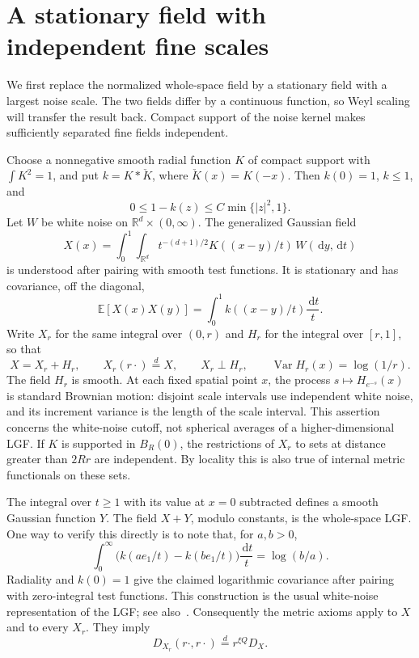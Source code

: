 \documentclass[11pt,letterpaper]{article}
\newcommand{\R}{\mathbb R}
\newcommand{\E}{\mathbb E}
\newcommand{\dd}{\,\mathrm d}
\DeclareMathOperator{\Var}{Var}
\theoremstyle{definition}
\theoremstyle{remark}
\numberwithin{equation}{section}
\begin{document}
\section{A stationary field with independent fine scales}\label{sec:field}

We first replace the normalized whole-space field by a stationary field with a largest noise scale. The two fields differ by a continuous function, so Weyl scaling will transfer the result back. Compact support of the noise kernel makes sufficiently separated fine fields independent.

Choose a nonnegative smooth radial function $K$ of compact support with $\int K^2=1$, and put $k=K*\check K$, where $\check K(x)=K(-x)$. Then $k(0)=1$, $k\le1$, and
\begin{equation}\label{eq:k-bound}
 0\le1-k(z)\le C\min\{|z|^2,1\}.
\end{equation}
Let $W$ be white noise on $\R^d\times(0,\infty)$. The generalized Gaussian field
\begin{equation}\label{eq:cutoff-field}
 X(x)=\int_0^1\int_{\R^d}
       t^{-(d+1)/2}K((x-y)/t)\,W(\dd y,\dd t)
\end{equation}
is understood after pairing with smooth test functions. It is stationary and has covariance, off the diagonal,
\begin{equation*}
 \E[X(x)X(y)]=\int_0^1 k((x-y)/t)\frac{\dd t}{t}.
\end{equation*}
Write $X_r$ for the same integral over $(0,r)$ and $H_r$ for the integral over $[r,1]$, so that
\begin{equation}\label{eq:scale-split}
 X=X_r+H_r,\qquad X_r(r\cdot)\stackrel d=X,\qquad
 X_r\perp H_r,\qquad \Var H_r(x)=\log(1/r).
\end{equation}
The field $H_r$ is smooth. At each fixed spatial point $x$, the process $s\mapsto H_{e^{-s}}(x)$ is standard Brownian motion: disjoint scale intervals use independent white noise, and its increment variance is the length of the scale interval. This assertion concerns the white-noise cutoff, not spherical averages of a higher-dimensional LGF. If $K$ is supported in $B_R(0)$, the restrictions of $X_r$ to sets at distance greater than $2Rr$ are independent. By locality this is also true of internal metric functionals on these sets.

The integral over $t\ge1$ with its value at $x=0$ subtracted defines a smooth Gaussian function $Y$. The field $X+Y$, modulo constants, is the whole-space LGF. One way to verify this directly is to note that, for $a,b>0$,
\begin{equation*}
 \int_0^\infty\bigl(k(ae_1/t)-k(be_1/t)\bigr)\frac{\dd t}{t}
 =\log(b/a).
\end{equation*}
Radiality and $k(0)=1$ give the claimed logarithmic covariance after pairing with zero-integral test functions. This construction is the usual white-noise representation of the LGF; see also~\cite{CZ}. Consequently the metric axioms apply to $X$ and to every $X_r$. They imply
\begin{equation}\label{eq:fine-metric-scaling}
 D_{X_r}(r\cdot,r\cdot)\stackrel d=r^{\xi Q}D_X.
\end{equation}
\end{document}
